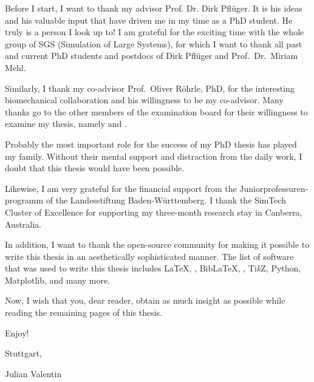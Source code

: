 
Before I start, I want to thank my advisor Prof. Dr. Dirk Pflüger.
It is his ideas and his valuable input that have driven me in
my time as a PhD student.
He truly is a person I look up to!
I am grateful for the exciting time with the whole group of SGS
(Simulation of Large Systems),
for which I want to thank all past and current PhD students and postdocs of
Dirk Pflüger and Prof.\ Dr.\ Miriam Mehl.

Similarly, I thank my co-advisor Prof.\ Oliver Röhrle, PhD, for the
interesting biomechanical collaboration and his willingness to be my co-advisor.
Many thanks go to the other members of the examination board for their
willingness to examine my thesis,
namely  and .

Probably the most important role for the success of my PhD thesis
has played my family.
Without their mental support and distraction from the daily work,
I doubt that this thesis would have been possible.

Likewise, I am very grateful for the financial support from
the \foreignlanguage{ngerman}{Juniorprofessurenprogramm} of the
\foreignlanguage{ngerman}{Landesstiftung Baden-Württemberg}.
I thank the SimTech Cluster of Excellence for supporting
my three-month research stay in Canberra, Australia.

In addition, I want to thank the open-source community for making it possible to
write this thesis in an aesthetically sophisticated manner.
The list of software that was used to write this thesis includes
\LaTeX, \LuaLaTeX, Bib\LaTeX,
\scalebox{0.9}{\KOMAScript}, Ti\emph{k}Z, Python, Matplotlib,
and many more.

\label{page:preface}
Now, I wish that you, dear reader, obtain as much insight as possible
while reading the remaining
 pages of this thesis.

Enjoy!

\vspace{1em}

\noindent
Stuttgart, \thedate

\noindent
Julian Valentin
